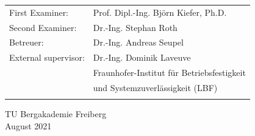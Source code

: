 \begin{titlepage}
\begin{center}
\begin{tabular}{l l}
	\vspace{0.2cm}
    \hspace*{1cm} \large{First Examiner:} & \hspace*{1cm}\large{Prof. Dipl.-Ing. Björn Kiefer, Ph.D.}\\
    \vspace{0.2cm}
    \hspace*{1cm} \large{Second Examiner:} & \hspace*{1cm}\large{Dr.-Ing. Stephan Roth}\\
	\vspace{0.2cm}
    \hspace*{1cm} \large{Betreuer:} & \hspace*{1cm}\large{Dr.-Ing. Andreas Seupel} \\

    \hspace*{1cm} \large {External supervisor:} & \hspace*{1cm}\large{Dr.-Ing. Dominik Laveuve }\\
    \hspace*{1cm}  & \hspace*{1cm}\large{Fraunhofer-Institut für Betriebsfestigkeit}\\ 
    \hspace*{1cm}  & \hspace*{1cm}\large{und Systemzuverlässigkeit (LBF) }\\\\  
   \end{tabular}
   
   \vspace*{0.7cm}
    \large { TU Bergakademie Freiberg } \\
     \vspace*{0.3cm}
    \large { August 2021 }
   
   
   
	\end{center}
\end{titlepage}